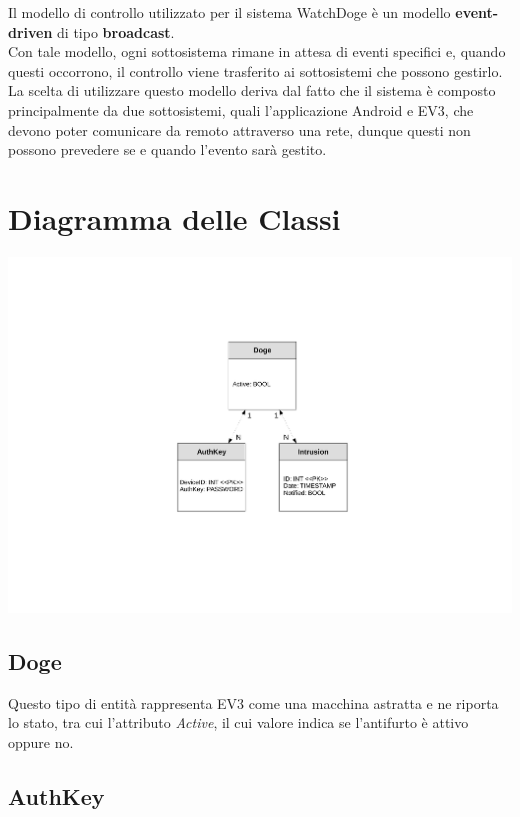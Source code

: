 \documentclass{article}
\begin{document}
Il modello di controllo utilizzato per il sistema WatchDoge è un modello \textbf{event-driven} di tipo \textbf{broadcast}. \\
Con tale modello, ogni sottosistema rimane in attesa di eventi specifici e, quando questi occorrono, il controllo viene trasferito ai sottosistemi che possono gestirlo. \\
La scelta di utilizzare questo modello deriva dal fatto che il sistema è composto principalmente da due sottosistemi, quali l'applicazione Android e EV3, che devono poter comunicare da remoto attraverso una rete, dunque questi non possono prevedere se e quando l'evento sarà gestito.

\section{Diagramma delle Classi}

\begin{center}
\includegraphics[width=16cm,page=1]{Class_diagram.pdf}
\end{center}

\subsection{Doge}

Questo tipo di entità rappresenta EV3 come una macchina astratta e ne riporta lo stato, tra cui l'attributo \textit{Active}, il cui valore indica se l'antifurto è attivo oppure no.

\subsection{AuthKey}
\end{document}
